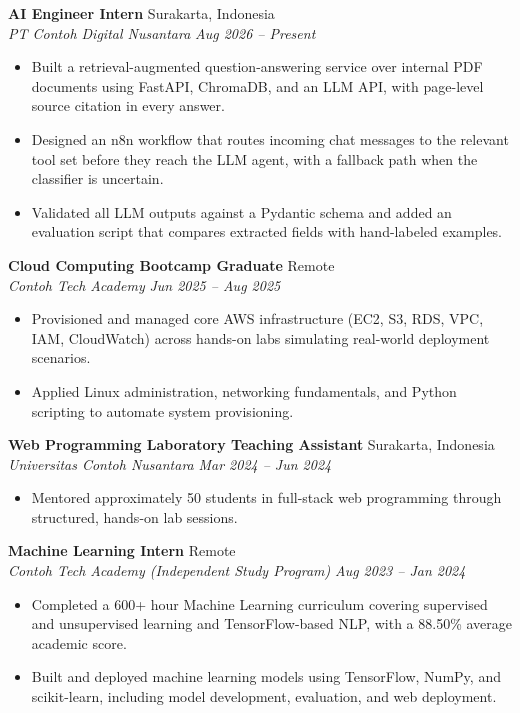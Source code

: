 \documentclass[a4paper,11pt]{article}
\newcommand{\resumeItem}[1]{\item\small{#1}}
\newcommand{\resumeSubheading}[4]{
  \vspace{2pt}
  \noindent\textbf{#1} \hfill #2 \\
  \noindent\textit{\small #3} \hfill \textit{\small #4}
  \vspace{-4pt}
}
\begin{document}
\resumeSubheading
    {AI Engineer Intern}{Surakarta, Indonesia}
    {PT Contoh Digital Nusantara}{Aug 2026 -- Present}
\begin{itemize}
  \resumeItem{Built a retrieval-augmented question-answering service over internal PDF documents using FastAPI, ChromaDB, and an LLM API, with page-level source citation in every answer.}
  \resumeItem{Designed an n8n workflow that routes incoming chat messages to the relevant tool set before they reach the LLM agent, with a fallback path when the classifier is uncertain.}
  \resumeItem{Validated all LLM outputs against a Pydantic schema and added an evaluation script that compares extracted fields with hand-labeled examples.}
\end{itemize}

\resumeSubheading
    {Cloud Computing Bootcamp Graduate}{Remote}
    {Contoh Tech Academy}{Jun 2025 -- Aug 2025}
\begin{itemize}
  \resumeItem{Provisioned and managed core AWS infrastructure (EC2, S3, RDS, VPC, IAM, CloudWatch) across hands-on labs simulating real-world deployment scenarios.}
  \resumeItem{Applied Linux administration, networking fundamentals, and Python scripting to automate system provisioning.}
\end{itemize}

\resumeSubheading
    {Web Programming Laboratory Teaching Assistant}{Surakarta, Indonesia}
    {Universitas Contoh Nusantara}{Mar 2024 -- Jun 2024}
\begin{itemize}
  \resumeItem{Mentored approximately 50 students in full-stack web programming through structured, hands-on lab sessions.}
\end{itemize}

\resumeSubheading
    {Machine Learning Intern}{Remote}
    {Contoh Tech Academy (Independent Study Program)}{Aug 2023 -- Jan 2024}
\begin{itemize}
  \resumeItem{Completed a 600+ hour Machine Learning curriculum covering supervised and unsupervised learning and TensorFlow-based NLP, with a 88.50\% average academic score.}
  \resumeItem{Built and deployed machine learning models using TensorFlow, NumPy, and scikit-learn, including model development, evaluation, and web deployment.}
\end{itemize}

\end{document}
